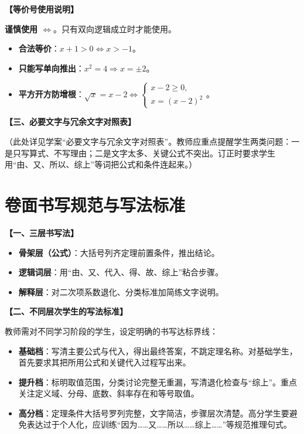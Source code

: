 \documentclass[11pt,a4paper]{ctexart}
\newcommand{\teachblock}[2]{%
  \par\addvspace{0.55em}%
  \noindent\textbf{【#1】}\par\nobreak
  \begingroup
    \raggedright
    \setlength{\parskip}{0.35em}%
    #2\par
  \endgroup
}
\begin{document}
\teachblock{等价号使用说明}{
  \textbf{谨慎使用 \(\Leftrightarrow\)}。只有双向逻辑成立时才能使用。
  \begin{itemize}
    \item \textbf{合法等价}：\(x+1 > 0 \Leftrightarrow x > -1\)。
    \item \textbf{只能写单向推出}：\(x^2=4 \Rightarrow x=\pm 2\)。
    \item \textbf{平方开方防增根}：\(\sqrt{x} = x-2 \Leftrightarrow \begin{cases} x-2 \ge 0, \\ x = (x-2)^2 \end{cases}\)。
  \end{itemize}
}

\teachblock{三、必要文字与冗余文字对照表}{
  （此处详见学案“必要文字与冗余文字对照表”。教师应重点提醒学生两类问题：一是只写算式、不写理由；二是文字太多、关键公式不突出。订正时要求学生用“由、又、所以、综上”等词把公式和条件连起来。）
}

\newpage

\section{卷面书写规范与写法标准}

\teachblock{一、三层书写法}{
  \begin{itemize}
    \item \textbf{骨架层（公式）}：大括号列齐定理前置条件，推出结论。
    \item \textbf{逻辑词层}：用“由、又、代入、得、故、综上”粘合步骤。
    \item \textbf{解释层}：对二次项系数退化、分类标准加简练文字说明。
  \end{itemize}
}

\teachblock{二、不同层次学生的写法标准}{
  教师需对不同学习阶段的学生，设定明确的书写达标界线：
  \begin{itemize}
    \item \textbf{基础档}：写清主要公式与代入，得出最终答案，不跳定理名称。对基础学生，首先要求其把所用公式和关键代入过程写出来。
    \item \textbf{提升档}：标明取值范围，分类讨论完整无重漏，写清退化检查与“综上”。重点关注定义域、分母、底数、斜率存在和等号取值。
    \item \textbf{高分档}：定理条件大括号罗列完整，文字简洁，步骤层次清楚。高分学生要避免表达过于个人化，应训练“因为……又……所以……综上……”等规范推理句式。
  \end{itemize}
}
\end{document}
